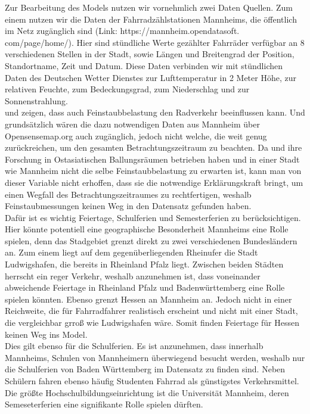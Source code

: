 \documentclass[a4paper,12pt]{thesis}
\begin{document}
Zur Bearbeitung des Models nutzen wir vornehmlich zwei Daten Quellen. Zum einem nutzen wir die Daten der Fahrradzählstationen Mannheims, die öffentlich im Netz zugänglich sind (Link: https://mannheim.opendatasoft. com/page/home/). Hier sind stündliche Werte gezählter Fahrräder verfügbar an 8 verschiedenen Stellen in der Stadt, sowie Längen und Breitengrad der Position, Standortname, Zeit und Datum. Diese Daten verbinden wir mit stündlichen Daten des Deutschen Wetter Dienstes zur Lufttemperatur in 2 Meter Höhe, zur relativen Feuchte, zum Bedeckungsgrad, zum Niederschlag und zur Sonnenstrahlung.\\
\cite{ZHAO2018826} und \cite{Hong2022} zeigen, dass auch Feinstaubbelastung den Radverkehr beeinflussen kann. Und grundsätzlich wären die dazu notwendigen Daten aus Mannheim über Opensensemap.org auch zugänglich, jedoch nicht welche, die weit genug zurückreichen, um den gesamten Betrachtungszeitraum zu beachten. Da \cite{ZHAO2018826} und \cite{Hong2022} ihre Forschung in Ostasiatischen Ballungsräumen betrieben haben und in einer Stadt wie Mannheim nicht die selbe Feinstaubbelastung zu erwarten ist, kann man von dieser Variable nicht erhoffen, dass sie die notwendige Erklärungskraft bringt, um einen Wegfall des Betrachtungszeitraumes zu rechtfertigen, weshalb Feinstaubmessungen keinen Weg in den Datensatz gefunden haben.\\
Dafür ist es wichtig Feiertage, Schulferien und Semesterferien zu berücksichtigen. Hier könnte potentiell eine geographische Besonderheit Mannheims eine Rolle spielen, denn das Stadgebiet grenzt direkt zu zwei verschiedenen Bundesländern an. Zum einem liegt auf dem gegenüberliegenden Rheinufer die Stadt Ludwigshafen, die bereits in Rheinland Pfalz liegt. Zwischen beiden Städten herrscht ein reger Verkehr, weshalb anzunehmen ist, dass voneinander abweichende Feiertage in Rheinland Pfalz und Badenwürttemberg eine Rolle spielen könnten. Ebenso grenzt Hessen an Mannheim an. Jedoch nicht in einer Reichweite, die für Fahrradfahrer realistisch erscheint und nicht mit einer Stadt, die vergleichbar grroß wie Ludwigshafen wäre. Somit finden Feiertage für Hessen keinen Weg ins Model.\\
Dies gilt ebenso für die Schulferien. Es ist anzunehmen, dass innerhalb Mannheims, Schulen von Mannheimern überwiegend besucht werden, weshalb nur die Schulferien von Baden Württemberg im Datensatz zu finden sind. Neben Schülern fahren ebenso häufig Studenten Fahrrad als günstigstes Verkehrsmittel. Die größte Hochschulbildungseinrichtung ist die Universität Mannheim, deren Semeseterferien eine signifikante Rolle spielen dürften.
\end{document}
